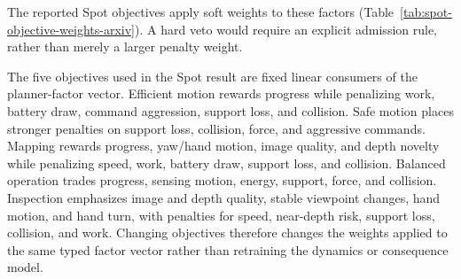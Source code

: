 The reported Spot objectives apply soft weights to these factors
(Table~\ref{tab:spot-objective-weights-arxiv}). A hard veto would require an
explicit admission rule, rather than merely a larger penalty weight.

The five objectives used in the Spot result are fixed linear consumers of the planner-factor vector.
Efficient motion rewards progress while penalizing work, battery draw, command aggression, support loss, and collision.
Safe motion places stronger penalties on support loss, collision, force, and aggressive commands.
Mapping rewards progress, yaw/hand motion, image quality, and depth novelty while penalizing speed, work, battery draw, support loss, and collision.
Balanced operation trades progress, sensing motion, energy, support, force, and collision.
Inspection emphasizes image and depth quality, stable viewpoint changes, hand motion, and hand turn, with penalties for speed, near-depth risk, support loss, collision, and work.
Changing objectives therefore changes the weights applied to the same typed factor vector rather than retraining the dynamics or consequence model.

